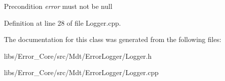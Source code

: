 \begin{DoxyPrecond}{Precondition}
{\itshape error} must not be null 
\end{DoxyPrecond}


Definition at line 28 of file Logger.\+cpp.



The documentation for this class was generated from the following files\+:\begin{DoxyCompactItemize}
\item 
libs/\+Error\+\_\+\+Core/src/\+Mdt/\+Error\+Logger/Logger.\+h\item 
libs/\+Error\+\_\+\+Core/src/\+Mdt/\+Error\+Logger/Logger.\+cpp\end{DoxyCompactItemize}
